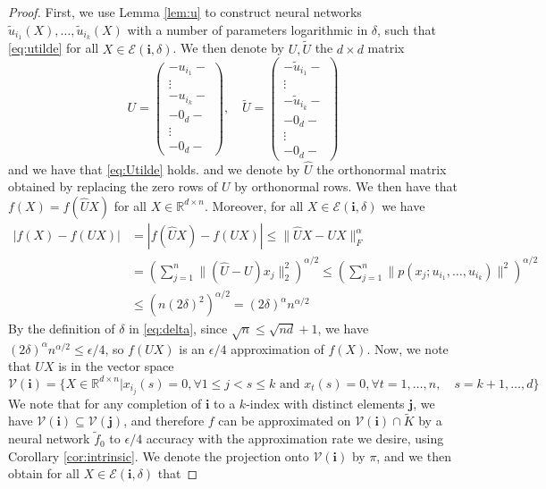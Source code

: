 \documentclass[twoside,11pt]{article}
\newcommand{\RR}{\mathbb{R}}
\begin{document}
\begin{proof}
First, we use Lemma \ref{lem:u} to construct neural networks $\tilde u_{i_1}(X),\ldots,\tilde u_{i_k}(X) $ with a number of parameters logarithmic in $\delta$, such that \eqref{eq:utilde} for all $X\in \mathcal{E}(\mathbf{i},\delta)$. We then denote by $U,\tilde U$ the $d\times d$ matrix
$$U=\begin{pmatrix}
- u_{i_1} -\\
\vdots\\
-u_{i_k}-\\
-0_d-\\
\vdots\\
-0_d-
\end{pmatrix}, \quad  
\tilde{U}=\begin{pmatrix}
-\tilde u_{i_1}-\\
\vdots\\
-\tilde u_{i_k}-\\
-0_d-\\
\vdots\\
-0_d-
\end{pmatrix}$$
and we have that \eqref{eq:Utilde} holds. 
and we denote by $\hat U$ the orthonormal matrix obtained by replacing the zero rows of $U$ by orthonormal rows. We then have that $f(X)=f(\hat U X)$ for all $X\in \RR^{d\times n}$. Moreover, for all $X\in \mathcal{E}(\mathbf{i},\delta)$ we have 
\begin{align*}
|f(X)-f(UX)|&=|f(\hat{U}X)-f(UX)|\leq \|\hat{U}X-UX\|_F^{\alpha} \\
&= \left(\sum_{j=1}^n \|(\hat{U}-U)x_j\|_2^2\right)^{\alpha/2} \leq  \left(\sum_{j=1}^n \|p(x_j;u_{i_1},\ldots,u_{i_k})\|^{2}\right)^{\alpha/2}\\
&\leq (n(2\delta)^2)^{\alpha/2} = (2\delta)^{\alpha}n^{\alpha/2}
\end{align*}
By the definition of $\delta$ in \eqref{eq:delta}, since $\sqrt{n}\leq \sqrt{nd}+1$, we have $(2\delta)^{\alpha}n^{\alpha/2}\leq \epsilon/4$, so $f(UX)$ is an $\epsilon/4$ approximation of $f(X)$. Now, we note that $UX$ is in the vector space 
$$\mathcal{V}(\mathbf{i})=\{X\in \RR^{d\times n}| x_{i_j}(s)=0, \forall 1\leq j<s \leq k \text{ and } x_t(s)=0, \forall t=1,\ldots,n, \quad s=k+1,\ldots,d \} $$
We note that for any completion of $\mathbf{i} $ to a $k$-index with distinct elements $\mathbf{j} $, we have $\mathcal{V}(\mathbf{i})\subseteq \mathcal{V}(\mathbf{j}) $, and therefore $f$ can be approximated on $\mathcal{V}(\mathbf{i})\cap \tilde K $ by a neural network $\tilde f_0$ to $\epsilon/4$ accuracy with the approximation rate we desire, using Corollary \ref{cor:intrinsic}. We denote the projection onto $\mathcal{V}(\mathbf{i}) $ by $\pi$, and we then obtain for all $X\in \mathcal{E}(\mathbf{i},\delta)$ that 

\end{proof}
\end{document}
